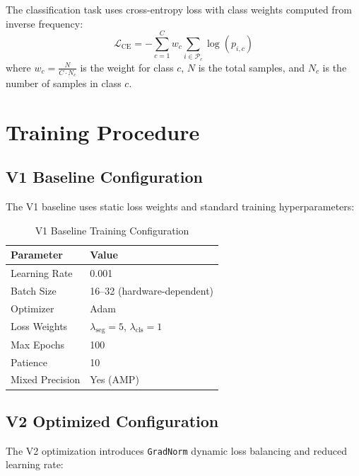 \documentclass[11pt,a4paper,twoside]{report}
\newcommand{\model}[1]{\texttt{#1}}
\begin{document}
The classification task uses cross-entropy loss with class weights computed from inverse frequency:
\begin{equation}
\mathcal{L}_{\text{CE}} = -\sum_{c=1}^{C} w_c \sum_{i \in \mathcal{P}_c} \log(p_{i,c})
\end{equation}
where $w_c = \frac{N}{C \cdot N_c}$ is the weight for class $c$, $N$ is the total samples, and $N_c$ is the number of samples in class $c$.

\section{Training Procedure}

\subsection{V1 Baseline Configuration}

The V1 baseline uses static loss weights and standard training hyperparameters:

\begin{table}[htbp]
\centering
\caption{V1 Baseline Training Configuration}
\label{tab:v1_config}
\begin{tabular}{ll}
\toprule
\textbf{Parameter} & \textbf{Value} \\
\midrule
Learning Rate & 0.001 \\
Batch Size & 16--32 (hardware-dependent) \\
Optimizer & Adam \\
Loss Weights & $\lambda_{\text{seg}} = 5$, $\lambda_{\text{cls}} = 1$ \\
Max Epochs & 100 \\
Patience & 10 \\
Mixed Precision & Yes (AMP) \\
\bottomrule
\end{tabular}
\end{table}

\subsection{V2 Optimized Configuration}

The V2 optimization introduces \model{GradNorm} dynamic loss balancing and reduced learning rate:
\end{document}
